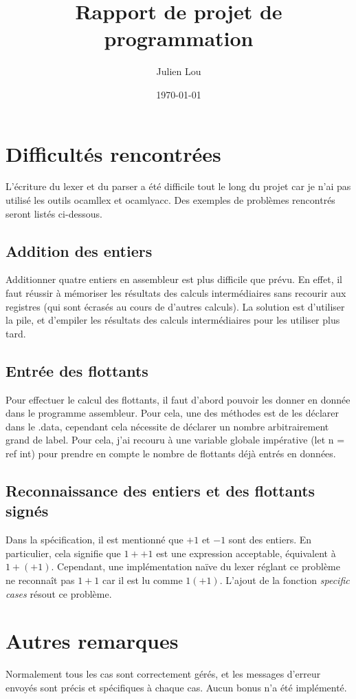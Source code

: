 \documentclass[12pt,french]{article}
\title{Rapport de projet de programmation}
\author{Julien Lou}
\date{\today}
\begin{document}
\maketitle

\section{Difficultés rencontrées}

L'écriture du lexer et du parser a été difficile tout le long du projet car je n'ai pas utilisé les outils ocamllex et ocamlyacc. Des exemples de problèmes rencontrés seront listés ci-dessous.

\subsection{Addition des entiers}
Additionner quatre entiers en assembleur est plus difficile que prévu. En effet, il faut réussir à mémoriser les résultats des calculs intermédiaires sans recourir aux registres (qui sont écrasés au cours de d'autres calculs). La solution est d'utiliser la pile, et d'empiler les résultats des calculs intermédiaires pour les utiliser plus tard.

\subsection{Entrée des flottants}
Pour effectuer le calcul des flottants, il faut d'abord pouvoir les donner en donnée dans le programme assembleur. Pour cela, une des méthodes est de les déclarer dans le .data, cependant cela nécessite de déclarer un nombre arbitrairement grand de label. Pour cela, j'ai recouru à une variable globale impérative (let n = ref int) pour prendre en compte le nombre de flottants déjà entrés en données.

\subsection{Reconnaissance des entiers et des flottants signés}
Dans la spécification, il est mentionné que $+1$ et $-1$ sont des entiers. En particulier, cela signifie que $1++1$ est une expression acceptable, équivalent à $1+(+1)$. Cependant, une implémentation naïve du lexer réglant ce problème ne reconnaît pas $1+1$ car il est lu comme $1 (+1)$. L'ajout de la fonction \textit{specific cases} résout ce problème.

\section{Autres remarques}
Normalement tous les cas sont correctement gérés, et les messages d'erreur envoyés sont précis et spécifiques à chaque cas. Aucun bonus n'a été implémenté.
\end{document}
